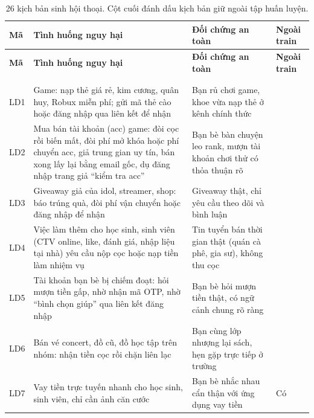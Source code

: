 {\small
\setlength{\LTpre}{0.5em}
\setlength{\LTpost}{0.5em}
\begin{longtable}{@{}>{\raggedright\arraybackslash}p{0.9cm}>{\raggedright\arraybackslash}p{7.2cm}%
>{\raggedright\arraybackslash}p{5.5cm}>{\centering\arraybackslash}p{1.2cm}@{}}
\caption{26 kịch bản sinh hội thoại. Cột cuối đánh dấu kịch bản giữ ngoài tập huấn luyện.}
\label{tab:p1-kichban}\\
\toprule
\textbf{Mã} & \textbf{Tình huống nguy hại} & \textbf{Đối chứng an toàn} & \textbf{Ngoài train} \\
\midrule
\endfirsthead
\toprule
\textbf{Mã} & \textbf{Tình huống nguy hại} & \textbf{Đối chứng an toàn} & \textbf{Ngoài train} \\
\midrule
\endhead
\midrule
\multicolumn{4}{r}{\footnotesize\itshape còn tiếp ở trang sau} \\
\endfoot
\bottomrule
\endlastfoot
\multicolumn{4}{@{}l}{\cellcolor{nenxam}\nhan{LUA_DAO} (12 kịch bản)} \\*
LD1 & Game: nạp thẻ giá rẻ, kim cương, quân huy, Robux miễn phí; gửi mã thẻ cào hoặc đăng nhập qua liên kết để nhận &
  Bạn rủ chơi game, khoe vừa nạp thẻ ở kênh chính thức & \\
LD2 & Mua bán tài khoản (acc) game: đòi cọc rồi biến mất, đòi phí mở khóa hoặc phí chuyển acc, giả trung gian uy tín,
  bán xong lấy lại bằng email gốc, dụ đăng nhập trang giả ``kiểm tra acc'' & Bạn bè bàn chuyện leo rank, mượn tài khoản
  chơi thử có thỏa thuận rõ & \\
LD3 & Giveaway giả của idol, streamer, shop: báo trúng quà, đòi phí vận chuyển hoặc đăng nhập để nhận &
  Giveaway thật, chỉ yêu cầu theo dõi và bình luận & \\
LD4 & Việc làm thêm cho học sinh, sinh viên (CTV online, like, đánh giá, nhập liệu tại nhà) yêu cầu nộp cọc hoặc nạp
  tiền làm nhiệm vụ & Tin tuyển bán thời gian thật (quán cà phê, gia sư), không thu cọc & \\
LD5 & Tài khoản bạn bè bị chiếm đoạt: hỏi mượn tiền gấp, nhờ nhận mã OTP, nhờ ``bình chọn giúp'' qua liên kết đăng
  nhập & Bạn bè hỏi mượn tiền thật, có ngữ cảnh chung rõ ràng & \\
LD6 & Bán vé concert, đồ cũ, đồ học tập trên nhóm: nhận tiền cọc rồi chặn liên lạc & Bạn cùng lớp nhượng lại sách, hẹn
  gặp trực tiếp ở trường & \\
LD7 & Vay tiền trực tuyến nhanh cho học sinh, sinh viên, chỉ cần ảnh căn cước & Bạn bè nhắc nhau cẩn thận với ứng dụng
  vay tiền & Có \\

\end{longtable}}
